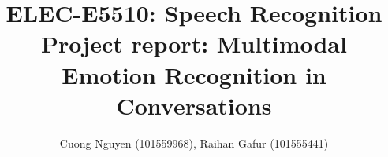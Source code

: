 \documentclass{article}
\title{ELEC-E5510: Speech Recognition\\
    \large Project report: Multimodal Emotion Recognition in Conversations}
\author{
Cuong Nguyen (101559968), Raihan Gafur (101555441)
}
\newcommand{\inlinemaketitle}{{\let\newpage\relax\maketitle}}
\begin{document}
\inlinemaketitle
\tableofcontents


% 
% 










\printbibliography[heading=bibintoc]

\begin{appendices}
	
\end{appendices}
\end{document}
